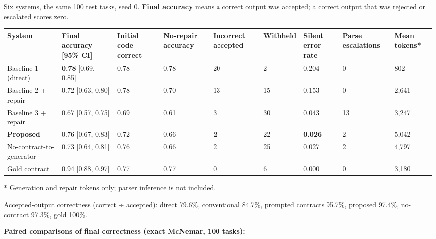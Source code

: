 \documentclass[11pt]{article}
\begin{document}
Six systems, the same 100 test tasks, seed 0. \textbf{Final accuracy}
means a correct output was accepted; a correct output that was rejected
or escalated scores zero.

\begin{table}[!tp]
\centering\scriptsize\setlength{\tabcolsep}{3pt}\renewcommand{\arraystretch}{1.1}
\begin{adjustbox}{max width=\textwidth}\begin{tabular}{lllllllll}
\toprule
\textbf{System} & \textbf{Final accuracy [95\% CI]} & \textbf{Initial code correct} & \textbf{No-repair accuracy} & \textbf{Incorrect accepted} & \textbf{Withheld} & \textbf{Silent error rate} & \textbf{Parse escalations} & \textbf{Mean tokens*} \\
\midrule
Baseline 1 (direct) & \textbf{0.78} [0.69, 0.85] & 0.78 & 0.78 & 20 & 2 & 0.204 & 0 & 802 \\
Baseline 2 + repair & 0.72 [0.63, 0.80] & 0.78 & 0.70 & 13 & 15 & 0.153 & 0 & 2,641 \\
Baseline 3 + repair & 0.67 [0.57, 0.75] & 0.69 & 0.61 & 3 & 30 & 0.043 & 13 & 3,247 \\
\textbf{Proposed} & 0.76 [0.67, 0.83] & 0.72 & 0.66 & \textbf{2} & 22 & \textbf{0.026} & 2 & 5,042 \\
No-contract-to-generator & 0.73 [0.64, 0.81] & 0.76 & 0.66 & 2 & 25 & 0.027 & 2 & 4,797 \\
Gold contract & 0.94 [0.88, 0.97] & 0.77 & 0.77 & 0 & 6 & 0.000 & 0 & 3,180 \\
\bottomrule
\end{tabular}\end{adjustbox}
\end{table}

* Generation and repair tokens only; parser inference is not included.

Accepted-output correctness (correct ÷ accepted): direct 79.6\%,
conventional 84.7\%, prompted contracts 95.7\%, proposed 97.4\%,
no-contract 97.3\%, gold 100\%.

\textbf{Paired comparisons of final correctness (exact McNemar, 100
tasks):}
\end{document}
